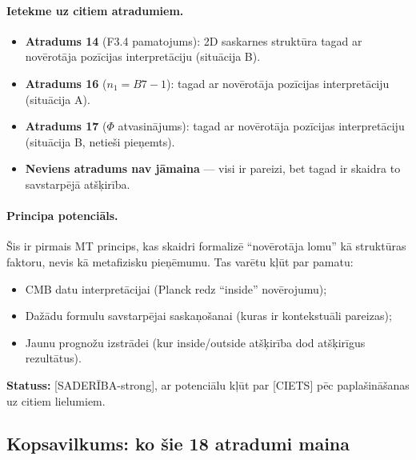 \documentclass[12pt,a4paper]{article}
\begin{document}
\paragraph{Ietekme uz citiem atradumiem.}
\begin{itemize}
    \item \textbf{Atradums 14} (F3.4 pamatojums): 2D saskarnes struktūra tagad ar novērotāja pozīcijas interpretāciju (situācija B).
    \item \textbf{Atradums 16} ($n_1 = B7-1$): tagad ar novērotāja pozīcijas interpretāciju (situācija A).
    \item \textbf{Atradums 17} ($\Phi$ atvasinājums): tagad ar novērotāja pozīcijas interpretāciju (situācija B, netieši pieņemts).
    \item \textbf{Neviens atradums nav jāmaina} — visi ir pareizi, bet tagad ir skaidra to savstarpējā atšķirība.
\end{itemize}

\paragraph{Principa potenciāls.}
Šis ir pirmais MT princips, kas skaidri formalizē ``novērotāja lomu'' kā struktūras faktoru, nevis kā metafizisku pieņēmumu. Tas varētu kļūt par pamatu:
\begin{itemize}
    \item CMB datu interpretācijai (Planck redz ``inside'' novērojumu);
    \item Dažādu formulu savstarpējai saskaņošanai (kuras ir kontekstuāli pareizas);
    \item Jaunu prognožu izstrādei (kur inside/outside atšķirība dod atšķirīgus rezultātus).
\end{itemize}

\textbf{Statuss:} [SADERĪBA-strong], ar potenciālu kļūt par [CIETS] pēc paplašināšanas uz citiem lielumiem.

\subsection*{Kopsavilkums: ko šie 18 atradumi maina}
\end{document}
